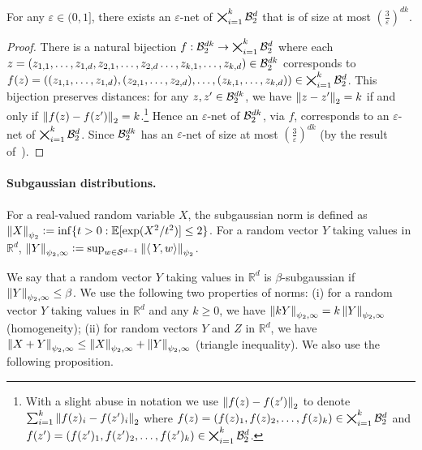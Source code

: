 \begin{proposition}\label{proposition:size-of-net}
    For any $\varepsilon \in (0,1]$, there exists an $\varepsilon$-net of $\bigtimes_{i=1}^k \mathcal{B}^d_2$ that is of size at most $\left(\frac{3}{\varepsilon}\right)^{dk}$.
\end{proposition}
\begin{proof}
    There is a natural bijection $f:\mathcal{B}^{dk}_2 \rightarrow  \bigtimes_{i=1}^k \mathcal{B}^d_2 $ where each $z = (z_{1,1}, \ldots, z_{1,d}, z_{2,1}, \ldots, z_{2,d} \allowbreak \ldots, z_{k,1}, \ldots, z_{k,d})\in \mathcal{B}^{dk}_2$ corresponds to $f(z) = ((z_{1,1}, \ldots, z_{1,d}), (z_{2,1}, \ldots, z_{2,d}), \ldots,\allowbreak (z_{k,1}, \ldots, z_{k,d})) \in \bigtimes_{i=1}^k \mathcal{B}^d_2$. This bijection preserves distances: for any $z,z' \in \mathcal{B}^{dk}_2$, we have $\left\lVert z - z'\right\rVert_2 = k$ if and only if $\left\lVert f(z) - f(z')\right\rVert_2 = k$.\footnote{With a slight abuse in notation we use  $\left\lVert f(z) - f(z')\right\rVert_2$ to denote $\sum_{i=1}^k \left\lVert f(z)_i - f(z')_i\right\rVert_2$ where $f(z) = (f(z)_1, f(z)_2, \ldots, f(z)_k) \in \bigtimes_{i=1}^k \mathcal{B}^d_2$ and $f(z') = (f(z')_1, f(z')_2, \ldots, f(z')_k) \in \bigtimes_{i=1}^k \mathcal{B}^d_2$.} Hence an $\varepsilon$-net of $\mathcal{B}^{dk}_2$, via $f$, corresponds to an $\varepsilon$-net of $\bigtimes_{i=1}^k \mathcal{B}^d_2$. Since $\mathcal{B}^{dk}_2$ has an $\varepsilon$-net of size at most $\left(\frac{3}{\varepsilon}\right)^{dk}$ (by the result of~\cite{kulkarni2024optimal}).
\end{proof}

\paragraph{Subgaussian distributions.}



\begin{definition}
    For a real-valued random variable $X$, the subgaussian norm is defined as $\left\lVert X\right\rVert_{\psi_2} \vcentcolon= \inf\{ t > 0: \operatorname*{\mathbb{E}}[\exp(X^2/t^2)] \leq 2 \}$. For a random vector $Y$ taking values in $\mathbb{R}^d$, $\left\lVert Y\right\rVert_{\psi_2, \infty} \vcentcolon= \sup_{w \in \mathcal{S}^{d-1}} \left\lVert \langle\, Y , w \rangle \right\rVert_{\psi_2}$.
\end{definition}

We say that a random vector $Y$ taking values in $\mathbb{R}^d$ 
is $\beta$-subgaussian if $\left\lVert Y\right\rVert_{\psi_2, \infty} \leq \beta$. We use the following two properties of norms: (i) for a random vector $Y$ taking values in $\mathbb{R}^d$ and any $k \geq 0$, we have $\left\lVert k Y\right\rVert_{\psi_2, \infty} = k \left\lVert Y\right\rVert_{\psi_2, \infty}$ (homogeneity); (ii) for random vectors $Y$ and $Z$ in $\mathbb{R}^d$, we have $\left\lVert X+ Y \right\rVert_{\psi_2, \infty} \leq \left\lVert X\right\rVert_{\psi_2, \infty} + \left\lVert Y\right\rVert_{\psi_2, \infty}$ (triangle inequality). We also use the following proposition.

